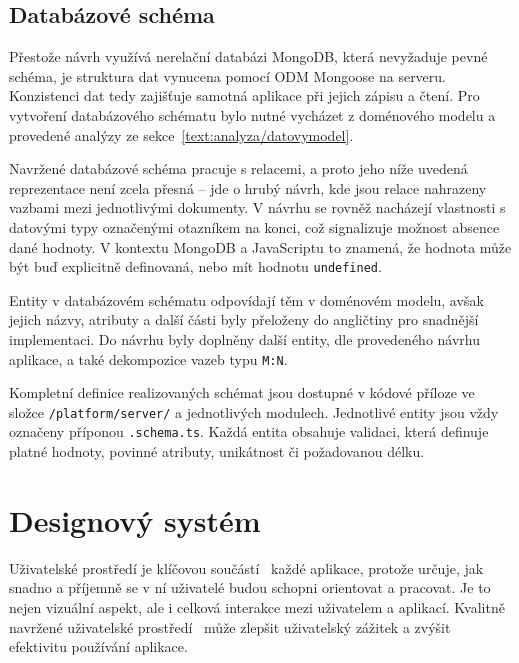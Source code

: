 \subsection{Databázové schéma}

Přestože návrh využívá nerelační databázi MongoDB, která nevyžaduje pevné schéma, je struktura dat vynucena pomocí ODM Mongoose na serveru.
Konzistenci dat tedy zajišťuje samotná aplikace při jejich zápisu a čtení. 
Pro vytvoření databázového schématu bylo nutné vycházet z doménového modelu a provedené analýzy ze sekce~\ref{text:analyza/datovymodel}.

Navržené databázové schéma pracuje s relacemi, a proto jeho níže uvedená reprezentace není zcela přesná -- jde o hrubý návrh, kde jsou relace nahrazeny vazbami mezi jednotlivými dokumenty. 
V návrhu se rovněž nacházejí vlastnosti s datovými typy označenými otazníkem na konci, což signalizuje možnost absence dané hodnoty.
V kontextu MongoDB a JavaScriptu to znamená, že hodnota může být buď explicitně definovaná, nebo mít hodnotu \texttt{undefined}.

Entity v databázovém schématu odpovídají těm v doménovém modelu, avšak jejich názvy, atributy a další části byly přeloženy do angličtiny pro snadnější implementaci. 
Do návrhu byly doplněny další entity, dle provedeného návrhu aplikace, a také dekompozice vazeb typu \texttt{M:N}. 

Kompletní definice realizovaných schémat jsou dostupné v kódové příloze ve složce \verb|/platform/server/| a jednotlivých modulech.
Jednotlivé entity jsou vždy označeny příponou \verb|.schema.ts|.
Každá entita obsahuje validaci, která definuje platné hodnoty, povinné atributy, unikátnost či požadovanou délku.


\section{Designový systém}

Uživatelské prostředí je klíčovou součástí~\cite{kholmatova_2017} každé aplikace, protože určuje, jak snadno a příjemně se v ní uživatelé budou schopni orientovat a pracovat. 
Je to nejen vizuální aspekt, ale i celková interakce mezi uživatelem a aplikací. 
Kvalitně navržené uživatelské prostředí~\cite{tidwell_2019} může zlepšit uživatelský zážitek a zvýšit efektivitu používání aplikace.

